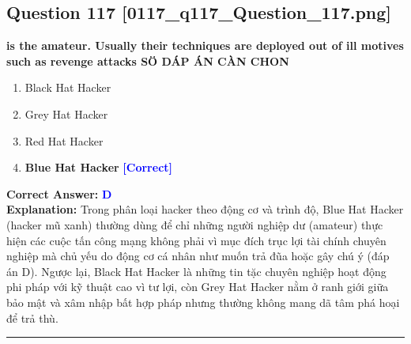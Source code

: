 \documentclass[11pt,a4paper]{article}
\begin{document}
\begin{minipage}{\textwidth}
\subsection*{Question 117 \quad \footnotesize{[0117\_q117\_Question\_117.png]}}
\noindent \textbf{is the amateur. Usually their techniques are deployed out of ill motives such as revenge attacks SÖ DÁP ÁN CÀN CHON}

\begin{enumerate}[label=\Alph*.]
    \item Black Hat Hacker
    \item Grey Hat Hacker
    \item Red Hat Hacker
    \item \textbf{Blue Hat Hacker} \hfill \textcolor{blue}{\textbf{[Correct]}}
\end{enumerate}

\noindent \textbf{Correct Answer:} \textcolor{blue}{\textbf{D}} \\[2pt]
\noindent \textbf{Explanation:} Trong phân loại hacker theo động cơ và trình độ, Blue Hat Hacker (hacker mũ xanh) thường dùng để chỉ những người nghiệp dư (amateur) thực hiện các cuộc tấn công mạng không phải vì mục đích trục lợi tài chính chuyên nghiệp mà chủ yếu do động cơ cá nhân như muốn trả đũa hoặc gây chú ý (đáp án D). Ngược lại, Black Hat Hacker là những tin tặc chuyên nghiệp hoạt động phi pháp với kỹ thuật cao vì tư lợi, còn Grey Hat Hacker nằm ở ranh giới giữa bảo mật và xâm nhập bất hợp pháp nhưng thường không mang dã tâm phá hoại để trả thù.

\par\vspace{0.3cm}
\hrule
\vspace{0.3cm}
\end{minipage}
\end{document}
